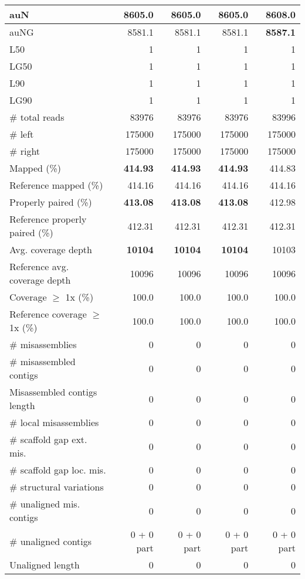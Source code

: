 \documentclass[12pt,a4paper]{article}
\begin{document}
\begin{table}[ht]
\begin{center}
\begin{tabular}{|l*{4}{|r}|}
auN & 8605.0 & 8605.0 & 8605.0 & {\bf 8608.0} \\ \hline
auNG & 8581.1 & 8581.1 & 8581.1 & {\bf 8587.1} \\ \hline
L50 & 1 & 1 & 1 & 1 \\ \hline
LG50 & 1 & 1 & 1 & 1 \\ \hline
L90 & 1 & 1 & 1 & 1 \\ \hline
LG90 & 1 & 1 & 1 & 1 \\ \hline
\# total reads & 83976 & 83976 & 83976 & 83996 \\ \hline
\# left & 175000 & 175000 & 175000 & 175000 \\ \hline
\# right & 175000 & 175000 & 175000 & 175000 \\ \hline
Mapped (\%) & {\bf 414.93} & {\bf 414.93} & {\bf 414.93} & 414.83 \\ \hline
Reference mapped (\%) & 414.16 & 414.16 & 414.16 & 414.16 \\ \hline
Properly paired (\%) & {\bf 413.08} & {\bf 413.08} & {\bf 413.08} & 412.98 \\ \hline
Reference properly paired (\%) & 412.31 & 412.31 & 412.31 & 412.31 \\ \hline
Avg. coverage depth & {\bf 10104} & {\bf 10104} & {\bf 10104} & 10103 \\ \hline
Reference avg. coverage depth & 10096 & 10096 & 10096 & 10096 \\ \hline
Coverage $\geq$ 1x (\%) & 100.0 & 100.0 & 100.0 & 100.0 \\ \hline
Reference coverage $\geq$ 1x (\%) & 100.0 & 100.0 & 100.0 & 100.0 \\ \hline
\# misassemblies & 0 & 0 & 0 & 0 \\ \hline
\# misassembled contigs & 0 & 0 & 0 & 0 \\ \hline
Misassembled contigs length & 0 & 0 & 0 & 0 \\ \hline
\# local misassemblies & 0 & 0 & 0 & 0 \\ \hline
\# scaffold gap ext. mis. & 0 & 0 & 0 & 0 \\ \hline
\# scaffold gap loc. mis. & 0 & 0 & 0 & 0 \\ \hline
\# structural variations & 0 & 0 & 0 & 0 \\ \hline
\# unaligned mis. contigs & 0 & 0 & 0 & 0 \\ \hline
\# unaligned contigs & 0 + 0 part & 0 + 0 part & 0 + 0 part & 0 + 0 part \\ \hline
Unaligned length & 0 & 0 & 0 & 0 \\ \hline

\end{tabular}
\end{center}
\end{table}
\end{document}
